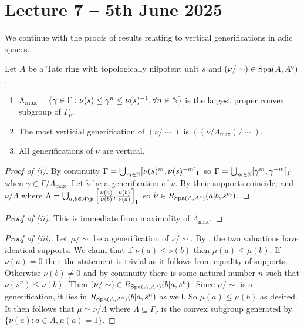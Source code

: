 \section{Lecture 7 -- 5th June 2025}\label{sec: lecture 7}
We continue with the proofs of results relating to vertical generifications in adic spaces. 
\begin{lemma}\label{lem: maximal convex subgroup}
    Let $A$ be a Tate ring with topologically nilpotent unit $s$ and $(\nu/\sim)\in\mathrm{Spa}(A,A^{\circ})$. 
    \begin{enumerate}[label=(\roman*)]
        \item $\Lambda_{\max}=\{\gamma\in\Gamma:\nu(s)\leq\gamma^{n}\leq\nu(s)^{-1},\forall n\in\mathbb{N}\}$ is the largest proper convex subgroup of $\Gamma_{\nu}$. 
        \item The most verticial generification of $(\nu/\sim)$ is $((\nu/\Lambda_{\max})/\sim)$. 
        \item All generifications of $\nu$ are vertical. 
    \end{enumerate}
\end{lemma}
\begin{proof}[Proof of (i)]
    By continuity $\Gamma=\bigcup_{m\in\mathbb{N}}[\nu(s)^{m},\nu(s)^{-m}]_{\Gamma}$ so $\Gamma=\bigcup_{m\in\mathbb{N}}[\gamma^{m},\gamma^{-m}]_{\Gamma}$ when $\gamma\in\Gamma/\Lambda_{\max}$. Let $\widetilde{\nu}$ be a generification of $\nu$. By  their supports coincide, and $\nu/\Lambda$ where $\Lambda=\bigcup_{a,b\in A\setminus\mathfrak{p}}\left[\frac{\nu(a)}{\nu(b)},\frac{\nu(b)}{\nu(a)}\right]_{\Gamma}$ so $\widetilde{\nu}\in R_{\mathrm{Spa}(A,A^{\circ})}(a|b,s^{m})$. 
\end{proof}
\begin{proof}[Proof of (ii)]
    This is immediate from maximality of $\Lambda_{\max}$. 
\end{proof}
\begin{proof}[Proof of (iii)]
    Let $\mu/\sim$ be a generification of $\nu/\sim$. By , the two valuations have identical supports. We claim that if $\nu(a)\leq\nu(b)$ then $\mu(a)\leq\mu(b)$. If $\nu(a)=0$ then the statement is trivial as it follows from equality of supports. Otherwise $\nu(b)\neq0$ and by continuity there is some natural number $n$ such that $\nu(s^{n})\leq\nu(b)$. Then $(\nu/\sim)\in R_{\mathrm{Spa}(A,A^{\circ})}(b|a,s^{n})$. Since $\mu/\sim$ is a generification, it lies in $R_{\mathrm{Spa}(A,A^{\circ})}(b|a,s^{n})$ as well. So $\mu(a)\leq\mu(b)$ as desired. It then follows that $\mu\simeq\nu/\Lambda$ where $\Lambda\subseteq\Gamma_{\nu}$ is the convex subgroup generated by $\{\nu(a):a\in A, \mu(a)=1\}$. 
\end{proof}
